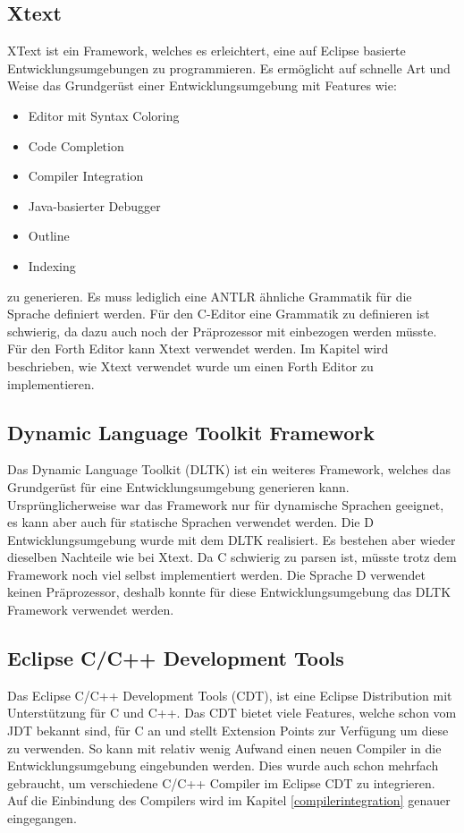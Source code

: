 \subsection{Xtext}
XText ist ein Framework, welches es erleichtert, eine auf Eclipse basierte Entwicklungsumgebungen zu programmieren. Es ermöglicht auf schnelle Art und Weise das Grundgerüst einer Entwicklungsumgebung mit Features wie:

\begin{itemize} 
	\item Editor mit Syntax Coloring
	\item Code Completion
	\item Compiler Integration
	\item Java-basierter Debugger
	\item Outline
	\item Indexing
\end{itemize}

zu generieren. \cite{xtext} Es muss lediglich eine ANTLR\cite{antlr} ähnliche Grammatik für die Sprache definiert werden. Für den C-Editor eine Grammatik zu definieren ist schwierig, da dazu auch noch der Präprozessor mit einbezogen werden müsste. Für den Forth Editor kann Xtext verwendet werden. Im Kapitel  wird beschrieben, wie Xtext verwendet wurde um einen Forth Editor zu implementieren.

\subsection{Dynamic Language Toolkit Framework}
Das Dynamic Language Toolkit (DLTK) ist ein weiteres Framework, welches das Grundgerüst für eine Entwicklungsumgebung generieren kann. Ursprünglicherweise war das Framework nur für dynamische Sprachen geeignet, es kann aber auch für statische Sprachen verwendet werden. Die D Entwicklungsumgebung wurde mit dem DLTK realisiert\cite{ddt}. Es bestehen aber wieder dieselben Nachteile wie bei Xtext. Da C schwierig zu parsen ist, müsste trotz dem Framework noch viel selbst implementiert werden. Die Sprache D verwendet keinen Präprozessor, deshalb konnte für diese Entwicklungsumgebung das DLTK Framework verwendet werden.

\subsection{Eclipse C/C++ Development Tools}
Das Eclipse C/C++ Development Tools (CDT), ist eine Eclipse Distribution mit Unterstützung für C und C++. Das CDT bietet viele Features, welche schon vom JDT bekannt sind, für C an und stellt Extension Points zur Verfügung um diese zu verwenden. So kann mit relativ wenig Aufwand einen neuen Compiler in die Entwicklungsumgebung eingebunden werden. Dies wurde auch schon mehrfach gebraucht, um verschiedene C/C++ Compiler im Eclipse CDT zu integrieren. Auf die Einbindung des Compilers wird im Kapitel \ref{compilerintegration} genauer eingegangen.

